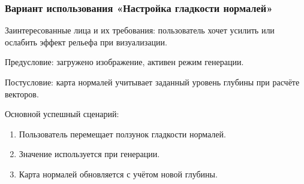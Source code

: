 \subsubsection{Вариант использования «Настройка гладкости нормалей»}

Заинтересованные лица и их требования: пользователь хочет усилить или ослабить эффект рельефа при визуализации.

Предусловие: загружено изображение, активен режим генерации.

Постусловие: карта нормалей учитывает заданный уровень глубины при расчёте векторов.

Основной успешный сценарий:
\begin{enumerate}
	\item Пользователь перемещает ползунок гладкости нормалей.
	\item Значение используется при генерации.
	\item Карта нормалей обновляется с учётом новой глубины.
\end{enumerate}